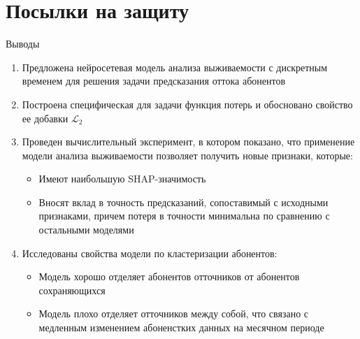 \documentclass[10pt,pdf,hyperref={unicode}]{beamer}
\begin{document}
\section{Посылки на защиту}
\begin{frame}{Выводы}
	\justifying
	\begin{minipage}{0.85\textwidth} %
		\begin{enumerate}
			\justifying
			\item Предложена нейросетевая модель анализа выживаемости с дискретным временем для решения задачи предсказания оттока абонентов 
			
			\item Построена специфическая для задачи функция потерь и обосновано свойство ее добавки $\mathcal{L}_2$
			
			\item Проведен вычислительный эксперимент, в котором показано, что применение модели анализа выживаемости позволяет получить новые признаки, которые: 
			\begin{itemize}
				\item Имеют наибольшую SHAP-значимость
				\item Вносят вклад в точность предсказаний, сопоставимый с исходными признаками, причем потеря в точности минимальна по сравнению с остальными моделями
			\end{itemize}
			\item Исследованы свойства модели по кластеризации абонентов: 
						\begin{itemize}
				\item Модель хорошо отделяет абонентов отточников от абонентов сохраняющихся
				\item Модель плохо отделяет отточников между собой, что связано с медленным изменением абоненстких данных на месячном периоде
			\end{itemize}
		\end{enumerate}
	\end{minipage}
\end{frame}

\end{document}
